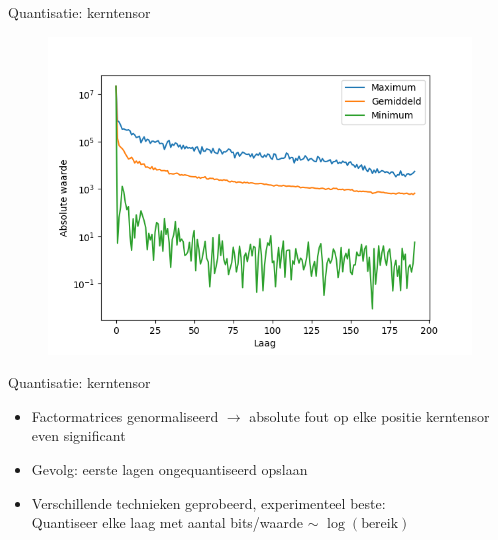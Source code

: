 \documentclass[t,12pt,dutch
\ifx\beamermode\undefined\else,\beamermode\fi
]{beamer}
\begin{document}
\begin{frame}{Quantisatie: kerntensor}

\begin{figure}[H]
\centering
\includegraphics[scale=0.5]{images/core_tensor_values_distribution.png}
\end{figure}

\end{frame}

\begin{frame}{Quantisatie: kerntensor}
\begin{itemize}
\item Factormatrices genormaliseerd $\rightarrow$ absolute fout op elke positie kerntensor even significant
\item Gevolg: eerste lagen ongequantiseerd opslaan
\item Verschillende technieken geprobeerd, experimenteel beste:\\
Quantiseer elke laag met aantal bits/waarde $\sim$ $\log (\text{bereik})$
\end{itemize}
\end{frame}
\end{document}
